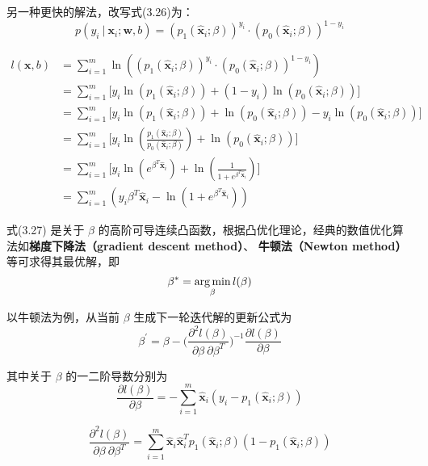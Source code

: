 \documentclass[../studies-ml.tex]{subfiles}
\begin{document}
\begin{anote}
  另一种更快的解法，改写式(3.26)为：
  \[
    p(y_i\ |\ \pmb{x}_i;\pmb{w},b) = (p_1(\hat{\pmb{x}}_i;\beta))^{y_i} \cdot (p_0(\hat{\pmb{x}}_i;\beta))^{1-y_i}
  \]

  \begin{equation*}
    \begin{split}
      l(\pmb{x},b) & = \sum_{i=1}^{m}\ln((p_1(\hat{\pmb{x}}_i;\beta))^{y_i} \cdot (p_0(\hat{\pmb{x}}_i;\beta))^{1-y_i}) \\
      & = \sum_{i=1}^{m}\Big[
        y_i \ln(p_1(\hat{\pmb{x}}_i;\beta)) + (1-y_i) \ln(p_0(\hat{\pmb{x}}_i;\beta))
        \Big] \\
      & = \sum_{i=1}^{m}\Big[
        y_i \ln(p_1(\hat{\pmb{x}}_i;\beta)) + \ln(p_0(\hat{\pmb{x}}_i;\beta)) - y_i \ln(p_0(\hat{\pmb{x}}_i;\beta))
        \Big] \\
      & = \sum_{i=1}^{m}\Big[
        y_i \ln(\frac{p_1(\hat{\pmb{x}}_i;\beta)}{p_0(\hat{\pmb{x}}_i;\beta)}) + \ln(p_0(\hat{\pmb{x}}_i;\beta))
        \Big] \\
      & = \sum_{i=1}^{m}\Big[
        y_i \ln(e^{\beta^T\hat{\pmb{x}}_i}) + \ln(\frac{1}{1+e^{\beta^T\hat{\pmb{x}}_i}})
        \Big] \\
      & = \sum_{i=1}^{m} (y_i \beta^T\hat{\pmb{x}}_i - \ln(1+e^{\beta^T\hat{\pmb{x}}_i}))
    \end{split}
  \end{equation*}
\end{anote}

式(3.27) 是关于 $\beta$ 的高阶可导连续凸函数，根据凸优化理论，经典的数值优化算法如\textbf{梯度下降法（gradient descent method）}、
\textbf{牛顿法（Newton method）}等可求得其最优解，即
\begin{equation}
  \beta^* = \operatorname*{\arg\min}_{\beta} l(\beta)
\end{equation}

以牛顿法为例，从当前 $\beta$ 生成下一轮迭代解的更新公式为
\begin{equation}
  \beta^{'} = \beta -
  \Biggl(\frac{\partial^2 l(\beta)}{\partial\beta\ \partial\beta^T}\Biggr)^{-1} \frac{\partial l(\beta)}{\partial\beta}
\end{equation}

其中关于 $\beta$ 的一二阶导数分别为
\begin{equation}
  \frac{\partial l(\beta)}{\partial\beta} = -\sum_{i=1}^{m}\hat{\pmb{x}}_i (y_i - p_1(\hat{\pmb{x}}_i;\beta))
\end{equation}

\begin{equation}
  \frac{\partial^2 l(\beta)}{\partial\beta\ \partial\beta^T} =
  \sum_{i=1}^{m} \hat{\pmb{x}}_i \hat{\pmb{x}}_i^T p_1(\hat{\pmb{x}}_i;\beta)(1-p_1(\hat{\pmb{x}}_i;\beta))
\end{equation}
\end{document}
